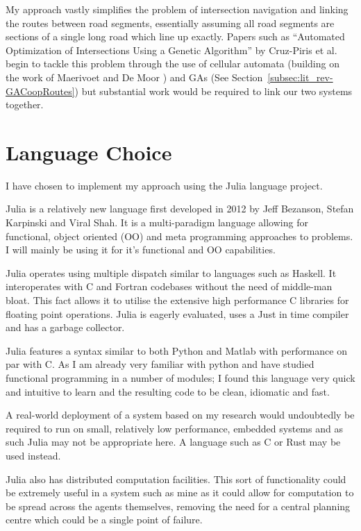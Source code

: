 My approach vastly simplifies the problem of intersection navigation and linking the routes between road segments, essentially assuming all road segments are sections of a single long road which line up exactly. Papers such as ``Automated Optimization of Intersections Using a Genetic Algorithm'' by Cruz-Piris et al.\cite{cruz-pirisAutomatedOptimizationIntersections2019} begin to tackle this problem through the use of cellular automata (building on the work of Maerivoet and De Moor\cite{maerivoetCellularAutomataModels2005}
) and GAs (See Section~\ref{subsec:lit_rev-GACoopRoutes}) but substantial work would be required to link our two systems together.



\section{Language Choice}

I have chosen to implement my approach using the Julia language project\cite{JuliaProgrammingLanguage}.

Julia is a relatively new language first developed in 2012 by Jeff Bezanson, Stefan Karpinski and Viral Shah. It is a multi-paradigm language allowing for functional, object oriented (OO) and meta programming approaches to problems. I will mainly be using it for it's functional and OO capabilities.

Julia operates using multiple dispatch similar to languages such as Haskell. It interoperates with C and Fortran codebases without the need of middle-man bloat. This fact allows it to utilise the extensive high performance C libraries for floating point operations. Julia is eagerly evaluated, uses a Just in time compiler and has a garbage collector.

Julia features a syntax similar to both Python and Matlab with performance on par with C. As I am already very familiar with python and have studied functional programming in a number of modules; I found this language very quick and intuitive to learn and the resulting code to be clean, idiomatic and fast.

A real-world deployment of a system based on my research would undoubtedly be required to run on small, relatively low performance, embedded systems and as such Julia may not be appropriate here. A language such as C or Rust may be used instead.

Julia also has distributed computation facilities. This sort of functionality could be extremely useful in a system such as mine as it could allow for computation to be spread across the agents themselves, removing the need for a central planning centre which could be a single point of failure.





